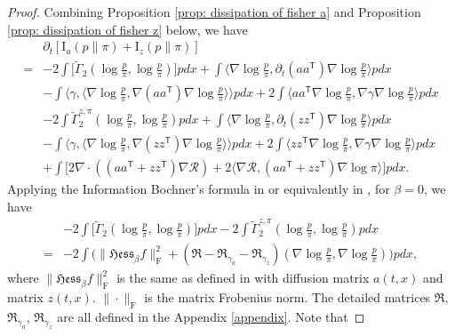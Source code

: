 \documentclass[11pt,reqno]{amsart}
\newcommand{\la}{\langle}
\newcommand{\ra}{\rangle}
\newcommand{\ts}{\mathsf{T}}
\def\pa{\partial}
\begin{document}
\begin{proof} Combining Proposition \ref{prop: dissipation of fisher a} and Proposition \ref{prop: dissipation of fisher z} below, we have 
    \begin{equation}
        \begin{split}
                  &\partial_t [\mathrm I_a(p\|\pi ) + \mathrm I_z(p\|\pi) ]\\
              =& -2\int\big[\widetilde \Gamma_2(\log\frac{{p} }{\pi},\log\frac{{p} }{\pi}) \big]{p}  dx
+\int \la \nabla\log\frac{{p} }{\pi},\pa_t(aa^{\ts})\nabla\log\frac{{p} }{\pi}\ra {p}  dx\nonumber \\
&-\int \la \gamma,\la \nabla \log\frac{{p} }{\pi}, \nabla(aa^{\ts})\nabla \log\frac{{p} }{\pi}\ra \ra {p}  dx+2\int \la aa^{\ts}\nabla \log\frac{{p} }{\pi}, \nabla \gamma \nabla \log\frac{{p} }{\pi}\ra {p}  dx\nonumber  \\	
& -2\int \widetilde\Gamma_2^{z,\pi}(\log\frac{{p} }{\pi},\log\frac{{p} }{\pi}){p}  dx
+\int \la \nabla\log\frac{{p} }{\pi},\pa_t(zz^{\ts})\nabla\log\frac{{p} }{\pi}\ra {p}  dx\nonumber \\
&-\int \la \gamma,\la \nabla \log\frac{{p} }{\pi}, \nabla(zz^{\ts})\nabla \log\frac{{p} }{\pi}\ra \ra {p}  dx+2\int \la zz^{\ts}\nabla \log\frac{{p} }{\pi}, \nabla \gamma \nabla \log\frac{{p} }{\pi}\ra {p}  dx \nonumber\\
& +\int\big[
2\nabla\cdot((aa^{\ts}+zz^{\ts})\nabla\mathcal{R})+2\la \nabla \mathcal R,( aa^{\ts}+zz^{\ts})\nabla\log\pi\ra \big]{p}  dx.
        \end{split}
    \end{equation}
    Applying the Information Bochner's formula in \cite[Theorem 3]{FengLi2021} or equivalently in \cite[Proposition 11]{FengLi2021}, for $\beta=0$, we have 
     \begin{equation}
    \begin{split}
             &-2\int\big[\widetilde \Gamma_2(\log\frac{{p} }{\pi},\log\frac{{p} }{\pi}) \big]{p}  dx-2\int \widetilde\Gamma_2^{z,\pi}(\log\frac{{p} }{\pi},\log\frac{{p} }{\pi}){p}  dx\\
              =&-2\int  \Big( \|\mathfrak{Hess}_{\beta} f\|_{\mathrm{F}}^2+ (\mathfrak R-\mathfrak R_{\gamma_a}-\mathfrak R_{\gamma_z} )(\nabla \log\frac{{p} }{\pi},\nabla \log\frac{{p} }{\pi})\Big){p}  dx,
              \end{split}
    \end{equation}
    where $\|\mathfrak{Hess}_{\beta} f\|_{\mathrm{F}}^2$ is the same as defined in \cite[Theorem 3]{FengLi2021} with diffusion matrix $a(t,x)$ and matrix $z(t,x)$. $\|\cdot\|_{\mathrm{F}}$ is the matrix Frobenius norm. The detailed matrices $\mathfrak R$, $\mathfrak R_{\gamma_a}$, $\mathfrak R_{\gamma_z}$ are all defined in the Appendix \ref{appendix}. Note that 

\end{proof}
\end{document}
